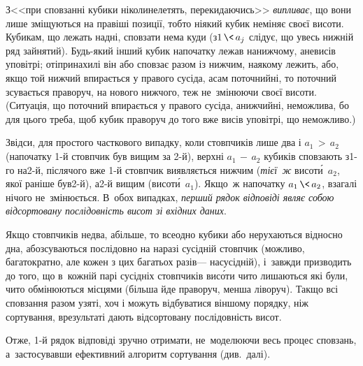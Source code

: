 \Tutorial	
{}
З\nolinebreak[3] <<при сповзанні кубики ніколи\nolinebreak[2] не\nolinebreak[3] летять, перекидаючись>> \emph{випливає}, що вони лише зміщуються на правіші позиції, тобто ніякий кубик не\nolinebreak[3] міняє своєї висоти. Кубикам, що лежать на\nolinebreak[3] дні, сповзати нема куди (з\nolinebreak[3] ${1\,{\<}\,a_j}$ слідує, що увесь нижній ряд зайнятий). Будь-який інший кубик на\nolinebreak[3] початку лежав на\nolinebreak[1] нижчому, а\nolinebreak[2] не\nolinebreak[2] висів у\nolinebreak[2] повітрі; от\nolinebreak[2] і\nolinebreak[1] при\nolinebreak[2] нахилі він або сповзає разом із нижчим, на\nolinebreak[2] якому лежить, або, якщо той нижчий впирається у правого сусіда, а\nolinebreak[3] сам поточний\nolinebreak[3] ні, то поточний зсувається праворуч, на нового нижчого, теж не~змінюючи своєї висоти. (Ситуація, що поточний впирається у правого сусіда, а\nolinebreak[3] нижчий\nolinebreak[3] ні, неможлива, бо для цього треба, щоб кубик праворуч до того вже висів у\nolinebreak[2] повітрі, що неможливо.)

Звідси, для простого часткового випадку, коли стовпчиків лише два і ${a_1\,{>}\,a_2}$ (на\nolinebreak[3] початку \mbox{1-й} стовпчик був вищим за \mbox{2-й}), верхні ${a_1\,{-}\,a_2}$ кубиків сповзають з\nolinebreak[3] \mbox{1-го} на\nolinebreak[3] \mbox{2-й}, після\nolinebreak[2] чого вже \mbox{1-й} стовпчик виявляється нижчим (\emph{тієї~ж} висот\'{и}~$a_2$, якої раніше був\nolinebreak[2] \mbox{2-й}), а\nolinebreak[3] \mbox{2-й} вищим (висот\'{и}~$a_1$). Якщо~ж на\nolinebreak[3] початку ${a_1\,{\<}\,a_2}$, взагалі нічого не~змінюється. В~обох випадках, \emph{перший рядок відповіді являє собою відсортовану послідовність висот зі вхідних даних}.

Якщо стовпчиків не\nolinebreak[3] два, а\nolinebreak[3] більше, то все\nolinebreak[3] одно кубики або не\nolinebreak[3] рухаються відносно дна, або\nolinebreak[3] зсуваються послідовно на наразі сусідній стовпчик (можливо, багатократно, але кожен з цих багатьох разів\nolinebreak[3] --- на\nolinebreak[3] сусідній), і~завжди призводить до того, що в~кожній парі сусідніх стовпчиків вис\'{о}ти чи\nolinebreak[3] то лишаються які були, чи\nolinebreak[3] то обмінюються місцями (більша йде праворуч, менша ліворуч). Так\nolinebreak[3] що всі сповзання разом узяті, хоч і можуть відбуватися в\nolinebreak[3] іншому порядку, ніж сортування, в\nolinebreak[3] результаті дають відсортовану послідовність висот.

Отже, \mbox{1-й} рядок відповіді зручно отримати, не~моделюючи весь процес сповзань, а~застосувавши ефективний алгоритм сортування (див.~далі). 



